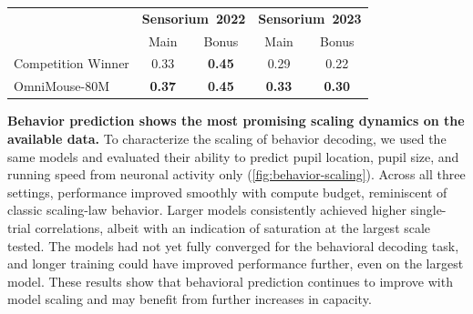 \documentclass{article} %
\begin{document}
\begin{table}[t!]
\vspace{-20pt}
\centering
\begin{minipage}[c]{0.3\linewidth}
\vspace{10pt}
\label{tab:sensorium_simple}
\end{minipage}
\hfill
\begin{minipage}[c]{0.65\linewidth}
\vspace{-5pt}
\centering
\footnotesize
\begin{tabular}{@{}l|cc|cc@{}}
\toprule
& \multicolumn{2}{c|}{\textbf{Sensorium\ 2022}} & \multicolumn{2}{c}{\textbf{Sensorium\ 2023}} \\
& Main & Bonus & Main & Bonus \\
\midrule
Competition Winner & 0.33 & \textbf{0.45} & 0.29 & 0.22 \\
OmniMouse-80M & \textbf{0.37} & \textbf{0.45} & \textbf{0.33} & \textbf{0.30} \\
\bottomrule
\end{tabular}
\end{minipage}
\normalsize
\vspace{-12pt} %
\end{table}

\textbf{Behavior prediction shows the most promising scaling dynamics on the available data.}
To characterize the scaling of behavior decoding, we used the same models and evaluated their ability to predict pupil location, pupil size, and running speed from neuronal activity only (\cref{fig:behavior-scaling}). 
Across all three settings, performance improved smoothly with compute budget, reminiscent of classic scaling-law behavior. 
Larger models consistently achieved higher single-trial correlations, albeit with an indication of saturation at the largest scale tested. 
The models had not yet fully converged for the behavioral decoding task, and longer training could have improved performance further, even on the largest model.
These results show that behavioral prediction continues to improve with model scaling and may benefit from further increases in capacity.
\end{document}
